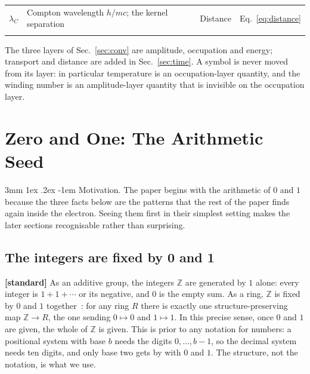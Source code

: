 \documentclass[%
 reprint, amsmath,amssymb, aps, prb, ]{revtex4-2}
\makeatletter
\numberwithin{equation}{section}
\renewcommand\paragraph{%
  \@startsection{paragraph}{4}{\z@}%
    {3mm \@plus 1ex \@minus .2ex}
    {-1em}
    {\normalfont\normalsize\itshape}}
\makeatother
\begin{document}
\begin{table}[t!]
\begin{tabular}{p{2.6cm}p{5.4cm}p{3.4cm}p{4.0cm}}
\addlinespace[0.3cm]
$\lambda_C$
& Compton wavelength $h/mc$; the kernel separation
& Distance
& Eq.~\eqref{eq:distance} \\
\addlinespace[0.2cm]
\bottomrule
\end{tabular}
\vspace{0.2cm}
\begin{minipage}{0.95\textwidth}
\justifying\footnotesize
The three layers of Sec.~\ref{sec:conv} are amplitude, occupation and energy; transport and distance are added in Sec.~\ref{sec:time}. A symbol is never moved from its layer: in particular temperature is an occupation-layer quantity, and the winding number is an amplitude-layer quantity that is invisible on the occupation layer.
\end{minipage}
\end{table}

\section{Zero and One: The Arithmetic Seed}
\label{sec:arith}

\paragraph{Motivation.} The paper begins with the arithmetic of $0$ and $1$ because the three facts below are the patterns that the rest of the paper finds again inside the electron. Seeing them first in their simplest setting makes the later sections recognisable rather than surprising.

\subsection{The integers are fixed by 0 and 1}

\textbf{[standard]} As an additive group, the integers $\mathbb{Z}$ are generated by $1$ alone: every integer is $1+1+\cdots$ or its negative, and $0$ is the empty sum. As a ring, $\mathbb{Z}$ is fixed by $0$ and $1$ together~\cite{ref:lang}: for any ring $R$ there is exactly one structure-preserving map $\mathbb{Z}\to R$, the one sending $0\mapsto0$ and $1\mapsto1$. In this precise sense, once $0$ and $1$ are given, the whole of $\mathbb{Z}$ is given. This is prior to any notation for numbers: a positional system with base $b$ needs the digits $0,\dots,b-1$, so the decimal system needs ten digits, and only base two gets by with $0$ and $1$. The structure, not the notation, is what we use.
\end{document}
